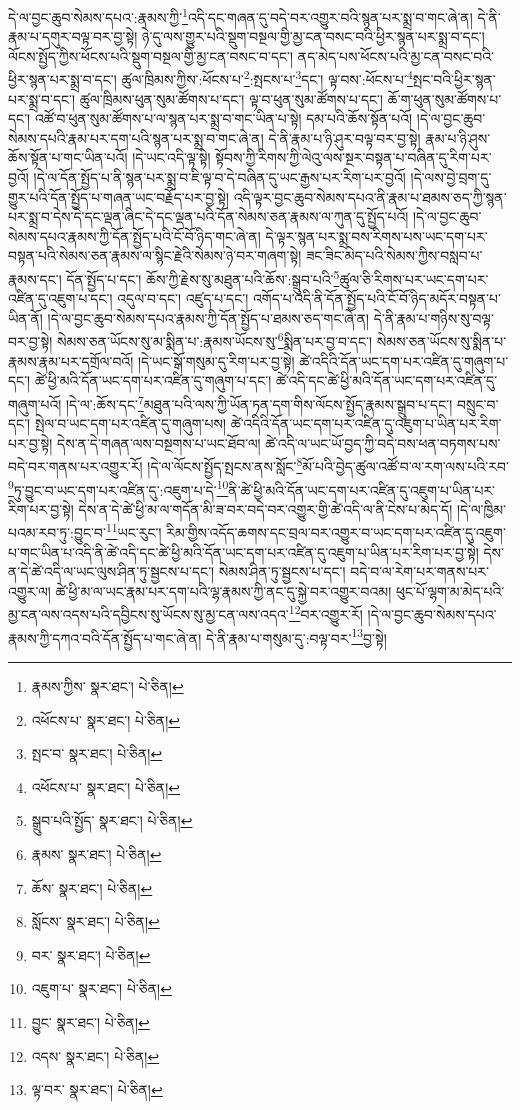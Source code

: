 དེ་ལ་བྱང་ཆུབ་སེམས་དཔའ་:རྣམས་ཀྱི་\footnote{རྣམས་ཀྱིས་  སྣར་ཐང་།  པེ་ཅིན། }འདི་དང་གཞན་དུ་བདེ་བར་འགྱུར་བའི་སྙན་པར་སྨྲ་བ་གང་ཞེ་ན། དེ་ནི་རྣམ་པ་དགུར་བལྟ་བར་བྱ་སྟེ། ཉེ་དུ་ལས་གྱུར་པའི་སྡུག་བསྔལ་གྱི་མྱ་ངན་བསང་བའི་ཕྱིར་སྙན་པར་སྨྲ་བ་དང་། ལོངས་སྤྱོད་ཀྱིས་ཕོངས་པའི་སྡུག་བསྔལ་གྱི་མྱ་ངན་བསང་བ་དང་། ནད་མེད་པས་ཕོངས་པའི་མྱ་ངན་བསང་བའི་ཕྱིར་སྙན་པར་སྨྲ་བ་དང་། ཚུལ་ཁྲིམས་ཀྱིས་:ཕོངས་པ་\footnote{འཕོངས་པ་  སྣར་ཐང་།  པེ་ཅིན། }:སྤངས་པ་\footnote{སྤང་བ་  སྣར་ཐང་།  པེ་ཅིན། }དང་། ལྟ་བས་:ཕོངས་པ་\footnote{འཕོངས་པ་  སྣར་ཐང་།  པེ་ཅིན། }སྤང་བའི་ཕྱིར་སྙན་པར་སྨྲ་བ་དང་། ཚུལ་ཁྲིམས་ཕུན་སུམ་ཚོགས་པ་དང་། ལྟ་བ་ཕུན་སུམ་ཚོགས་པ་དང་། ཆོ་ག་ཕུན་སུམ་ཚོགས་པ་དང་། འཚོ་བ་ཕུན་སུམ་ཚོགས་པ་ལ་སྙན་པར་སྨྲ་བ་གང་ཡིན་པ་སྟེ། དམ་པའི་ཆོས་སྟོན་པའོ། །དེ་ལ་བྱང་ཆུབ་སེམས་དཔའི་རྣམ་པར་དག་པའི་སྙན་པར་སྨྲ་བ་གང་ཞེ་ན། དེ་ནི་རྣམ་པ་ཉི་ཤུར་བལྟ་བར་བྱ་སྟེ། རྣམ་པ་ཉི་ཤུས་ཆོས་སྟོན་པ་གང་ཡིན་པའོ། །དེ་ཡང་འདི་ལྟ་སྟེ། སྟོབས་ཀྱི་རིགས་ཀྱི་ལེའུ་ལས་སྔར་བསྟན་པ་བཞིན་དུ་རིག་པར་བྱའོ། །དེ་ལ་དོན་སྤྱོད་པ་ནི་སྙན་པར་སྨྲ་བ་ཇི་ལྟ་བ་དེ་བཞིན་དུ་ཡང་རྒྱས་པར་རིག་པར་བྱའོ། །དེ་ལས་བྱེ་བྲག་དུ་གྱུར་པའི་དོན་སྤྱོད་པ་གཞན་ཡང་བརྗོད་པར་བྱ་སྟེ། འདི་ལྟར་བྱང་ཆུབ་སེམས་དཔའ་ནི་རྣམ་པ་ཐམས་ཅད་ཀྱི་སྙན་པར་སྨྲ་བ་དེས་དེ་དང་ལྡན་ཞིང་དེ་དང་ལྡན་པའི་དོན་སེམས་ཅན་རྣམས་ལ་ཀུན་དུ་སྤྱོད་པའོ། །དེ་ལ་བྱང་ཆུབ་སེམས་དཔའ་རྣམས་ཀྱི་དོན་སྤྱོད་པའི་ངོ་བོ་ཉིད་གང་ཞེ་ན། དེ་ལྟར་སྙན་པར་སྨྲ་བས་རིགས་པས་ཡང་དག་པར་བསྟན་པའི་སེམས་ཅན་རྣམས་ལ་སྙིང་རྗེའི་སེམས་ཉེ་བར་གཞག་སྟེ། ཟང་ཟིང་མེད་པའི་སེམས་ཀྱིས་བསླབ་པ་རྣམས་དང་། དོན་སྤྱོད་པ་དང་། ཆོས་ཀྱི་རྗེས་སུ་མཐུན་པའི་ཆོས་:སྒྲུབ་པའི་\footnote{སྒྲུབ་པའི་སྤྱོད་  སྣར་ཐང་།  པེ་ཅིན། }ཚུལ་ཅི་རིགས་པར་ཡང་དག་པར་འཛིན་དུ་འཇུག་པ་དང་། འདུལ་བ་དང་། འཛུད་པ་དང་། འགོད་པ་འདི་ནི་དོན་སྤྱོད་པའི་ངོ་བོ་ཉིད་མདོར་བསྟན་པ་ཡིན་ནོ། །དེ་ལ་བྱང་ཆུབ་སེམས་དཔའ་རྣམས་ཀྱི་དོན་སྤྱོད་པ་ཐམས་ཅད་གང་ཞེ་ན། དེ་ནི་རྣམ་པ་གཉིས་སུ་བལྟ་བར་བྱ་སྟེ། སེམས་ཅན་ཡོངས་སུ་མ་སྨིན་པ་:རྣམས་ཡོངས་སུ་\footnote{རྣམས་  སྣར་ཐང་།  པེ་ཅིན། }སྨིན་པར་བྱ་བ་དང་། སེམས་ཅན་ཡོངས་སུ་སྨིན་པ་རྣམས་རྣམ་པར་དགྲོལ་བའོ། །དེ་ཡང་སྒོ་གསུམ་དུ་རིག་པར་བྱ་སྟེ། ཚེ་འདིའི་དོན་ཡང་དག་པར་འཛིན་དུ་གཞུག་པ་དང་། ཚེ་ཕྱི་མའི་དོན་ཡང་དག་པར་འཛིན་དུ་གཞུག་པ་དང་། ཚེ་འདི་དང་ཚེ་ཕྱི་མའི་དོན་ཡང་དག་པར་འཛིན་དུ་གཞུག་པའོ། །དེ་ལ་:ཆོས་དང་\footnote{ཆོས་  སྣར་ཐང་།  པེ་ཅིན། }མཐུན་པའི་ལས་ཀྱི་ཡོན་ཏན་དག་གིས་ལོངས་སྤྱོད་རྣམས་སྒྲུབ་པ་དང་། བསྲུང་བ་དང་། སྤེལ་བ་ཡང་དག་པར་འཛིན་དུ་གཞུག་པས། ཚེ་འདིའི་དོན་ཡང་དག་པར་འཛིན་དུ་འཇུག་པ་ཡིན་པར་རིག་པར་བྱ་སྟེ། དེས་ན་དེ་གཞན་ལས་བསྔགས་པ་ཡང་ཐོབ་ལ། ཚེ་འདི་ལ་ཡང་ཡོ་བྱད་ཀྱི་བདེ་བས་ཕན་བཏགས་པས་བདེ་བར་གནས་པར་འགྱུར་རོ། །དེ་ལ་ལོངས་སྤྱོད་སྤངས་ནས་སློང་\footnote{སློངས་  སྣར་ཐང་།  པེ་ཅིན། }མོ་པའི་བྱེད་ཚུལ་འཚོ་བ་ལ་རག་ལས་པའི་རབ་\footnote{བར་  སྣར་ཐང་།  པེ་ཅིན། }ཏུ་བྱུང་བ་ཡང་དག་པར་འཛིན་དུ་:འཇུག་པ་དེ་\footnote{འཇུག་པ་  སྣར་ཐང་།  པེ་ཅིན། }ནི་ཚེ་ཕྱི་མའི་དོན་ཡང་དག་པར་འཛིན་དུ་འཇུག་པ་ཡིན་པར་རིག་པར་བྱ་སྟེ། དེས་ན་དེ་ཚེ་ཕྱི་མ་ལ་གདོན་མི་ཟ་བར་བདེ་བར་འགྱུར་གྱི་ཚེ་འདི་ལ་ནི་ངེས་པ་མེད་དོ། །དེ་ལ་ཁྱིམ་པའམ་རབ་ཏུ་:བྱུང་བ་\footnote{བྱུང་  སྣར་ཐང་།  པེ་ཅིན། }ཡང་རུང་། རིམ་གྱིས་འདོད་ཆགས་དང་བྲལ་བར་འགྱུར་བ་ཡང་དག་པར་འཛིན་དུ་འཇུག་པ་གང་ཡིན་པ་འདི་ནི་ཚེ་འདི་དང་ཚེ་ཕྱི་མའི་དོན་ཡང་དག་པར་འཛིན་དུ་འཇུག་པ་ཡིན་པར་རིག་པར་བྱ་སྟེ། དེས་ན་དེ་ཚེ་འདི་ལ་ཡང་ལུས་ཤིན་ཏུ་སྦྱངས་པ་དང་། སེམས་ཤིན་ཏུ་སྦྱངས་པ་དང་། བདེ་བ་ལ་རེག་པར་གནས་པར་འགྱུར་ལ། ཚེ་ཕྱི་མ་ལ་ཡང་རྣམ་པར་དག་པའི་ལྷ་རྣམས་ཀྱི་ནང་དུ་སྐྱེ་བར་འགྱུར་བའམ། ཕུང་པོ་ལྷག་མ་མེད་པའི་མྱ་ངན་ལས་འདས་པའི་དབྱིངས་སུ་ཡོངས་སུ་མྱ་ངན་ལས་འདའ་\footnote{འདས་  སྣར་ཐང་།  པེ་ཅིན། }བར་འགྱུར་རོ། །དེ་ལ་བྱང་ཆུབ་སེམས་དཔའ་རྣམས་ཀྱི་དཀའ་བའི་དོན་སྤྱོད་པ་གང་ཞེ་ན། དེ་ནི་རྣམ་པ་གསུམ་དུ་:བལྟ་བར་\footnote{ལྟ་བར་  སྣར་ཐང་།  པེ་ཅིན། }བྱ་སྟེ། 